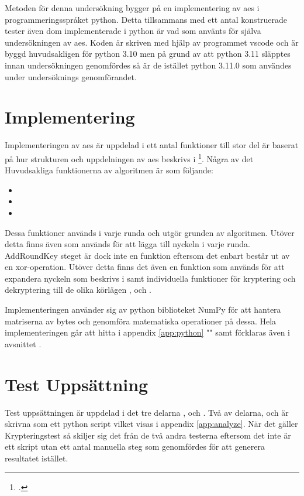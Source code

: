 Metoden för denna undersökning bygger på en implementering av \acrshort{aes} i programmeringsspråket
\gls{python}. Detta tillsammans med ett antal konstruerade tester även dom implementerade i
\gls{python} är vad som använts för själva undersökningen av \acrshort{aes}. Koden
är skriven med hjälp av programmet \gls{vscode} och är byggd huvudsakligen för \gls{python} 3.10 men
på grund av att \gls{python} 3.11 släpptes innan undersökningen genomfördes så är de istället \gls{python} 3.11.0
som användes under undersöknings genomförandet.

\section{Implementering} %
Implementeringen av \acrshort{aes} är uppdelad i ett antal funktioner till stor del är baserat på
hur strukturen och uppdelningen av \acrshort{aes} beskrivs i \footcite{daemen1999aes}.
Några av det Huvudsakliga funktionerna av algoritmen är som följande:
\begin{itemize}
    \item \texttt{}
    \item \texttt{}
    \item \texttt{}
\end{itemize}

Dessa funktioner används i varje runda och utgör grunden av algoritmen. Utöver detta finns
även  som används för att lägga till nyckeln i varje runda. AddRoundKey steget är dock inte
en funktion eftersom det enbart består ut av en \gls{xor}-operation. Utöver detta finns det även
en funktion som används för att expandera nyckeln som beskrivs i  samt
individuella funktioner för kryptering och dekryptering till de olika körlägen ,  och
.

Implementeringen använder sig av \gls{python} biblioteket NumPy för att hantera matriserna av \gls{byte}s och genomföra
matematiska operationer på dessa. Hela implementeringen går att hitta i appendix \ref{app:python} "" samt
förklaras även i avsnittet .

\section{Test Uppsättning} %
Test uppsättningen är uppdelad i det tre delarna ,  och . Två av delarna,  och
 är skrivna som ett \gls{python} script vilket visas i appendix \ref{app:analyze}. När det gäller Krypteringstest så skiljer sig det från de två andra testerna eftersom det
inte är ett skript utan ett antal manuella steg som genomfördes för att generera resultatet istället.

